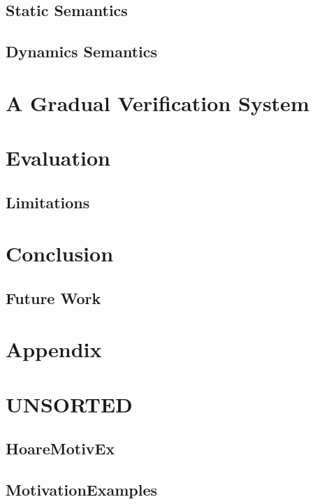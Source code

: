 \section{Static Semantics}

\section{Dynamics Semantics}

\chapter{A Gradual Verification System}

\chapter{Evaluation}

\section{Limitations}

\chapter{Conclusion}

\section{Future Work}

\chapter{Appendix}

\chapter{UNSORTED}

\section{HoareMotivEx}
\label{sec:hoaremotivex}


\section{MotivationExamples}
\label{sec:motivationexamples}


